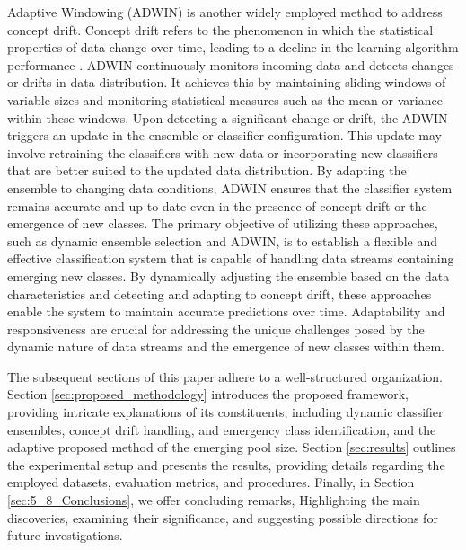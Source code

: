 Adaptive Windowing (ADWIN) is another widely employed method to address concept drift. Concept drift refers to the phenomenon in which the statistical properties of data change over time, leading to a decline in the learning algorithm performance \cite{gama2004learning, adams2023explainable, madkour2023historical}. ADWIN continuously monitors incoming data and detects changes or drifts in data distribution. It achieves this by maintaining sliding windows of variable sizes and monitoring statistical measures such as the mean or variance within these windows. Upon detecting a significant change or drift, the ADWIN triggers an update in the ensemble or classifier configuration. This update may involve retraining the classifiers with new data or incorporating new classifiers that are better suited to the updated data distribution. By adapting the ensemble to changing data conditions, ADWIN ensures that the classifier system remains accurate and up-to-date even in the presence of concept drift or the emergence of new classes. The primary objective of utilizing these approaches, such as dynamic ensemble selection and ADWIN, is to establish a flexible and effective classification system that is capable of handling data streams containing emerging new classes. By dynamically adjusting the ensemble based on the data characteristics and detecting and adapting to concept drift, these approaches enable the system to maintain accurate predictions over time. Adaptability and responsiveness are crucial for addressing the unique challenges posed by the dynamic nature of data streams and the emergence of new classes within them.

The subsequent sections of this paper adhere to a well-structured organization. Section \ref{sec:proposed_methodology} introduces the proposed framework, providing intricate explanations of its constituents, including dynamic classifier ensembles, concept drift handling, and emergency class identification, and the adaptive proposed method of the emerging pool size. Section \ref{sec:results} outlines the experimental setup and presents the results, providing details regarding the employed datasets, evaluation metrics, and procedures. Finally, in Section \ref{sec:5_8_Conclusions}, we offer concluding remarks, Highlighting the main discoveries, examining their significance, and suggesting possible directions for future investigations.
  
  
